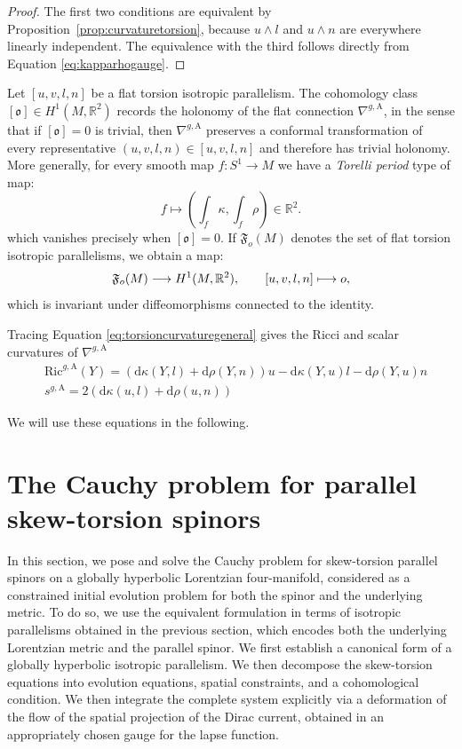 \documentclass[10pt,reqno,a4paper]{amsart}
\theoremstyle{plain}
\theoremstyle{definition}
\theoremstyle{remark}
\theoremstyle{remark}
\def\mA{\mathrm{A}}
\def\dd{\mathrm{d}}
\newcommand{\Ric}{\mathrm{Ric}}
\renewcommand{\(}{ (}
\renewcommand{\)}{ )}
\begin{document}
\begin{proof}
The first two conditions are equivalent by Proposition~\ref{prop:curvaturetorsion}, because $u\wedge l$ and $u\wedge n$ are everywhere linearly independent.  The equivalence with the third follows directly from Equation \eqref{eq:kapparhogauge}.
\end{proof}  

\noindent
Let $[u,v,l,n]$ be a flat torsion isotropic parallelism. The cohomology class $[\mathfrak{o}]  \in H^1 (M,\mathbb R^2)$ records the holonomy of the flat connection $\nabla^{g,\mA}$, in the sense that if $[\mathfrak{o}] = 0$ is trivial, then $\nabla^{g,\mA}$ preserves a conformal transformation of every representative $(u,v,l,n) \in [u,v,l,n]$ and therefore has trivial holonomy. More generally, for every smooth map $f \colon S^1 \to M$ we have a \emph{Torelli period} type of map:
\begin{equation*}
f\longmapsto (\int_f\kappa,\int_f\rho)\in\mathbb R^2.
\end{equation*}
which vanishes precisely when $[\mathfrak{o}] = 0$.  If $\mathfrak F_o(M)$ denotes the set of flat torsion isotropic parallelisms, we obtain a map:
\begin{equation*} 
\mathfrak F_o(M)\longrightarrow H^1(M,\mathbb R^2),
\qquad [u,v,l,n]\longmapsto\mathfrak \mathfrak{o},
\end{equation*}
which is invariant under diffeomorphisms connected to the identity.\medskip

\noindent
Tracing Equation \eqref{eq:torsioncurvaturegeneral} gives the Ricci and scalar curvatures of $\nabla^{g,\mA}$ 
\begin{eqnarray*}
& \Ric^{g,\mA} (Y) = (\dd\kappa(Y,l)+\dd\rho(Y,n) )u -\dd\kappa(Y,u)l-\dd\rho(Y,u)n \\
&s^{g,\mA} = 2 (\dd\kappa(u,l)+\dd\rho(u,n) ) 
\end{eqnarray*} 

\noindent
We will use these equations in the following. 
 
 

%
%
%
%

\section{The Cauchy problem for parallel skew-torsion spinors}
\label{sec:CauchyKillingSkew}

%
%
%
%

In this section, we pose and solve the Cauchy problem for skew-torsion parallel spinors on a globally hyperbolic Lorentzian four-manifold, considered as a constrained initial evolution problem for both the spinor and the underlying metric. To do so, we use the equivalent formulation in terms of isotropic parallelisms obtained in the previous section, which encodes both the underlying Lorentzian metric and the parallel spinor. We first establish a canonical form of a globally hyperbolic isotropic parallelism. We then decompose the skew-torsion equations into evolution equations, spatial constraints, and a cohomological condition. We then integrate the complete system explicitly via a deformation of the flow of the spatial projection of the Dirac current, obtained in an appropriately chosen gauge for the lapse function.  
 
\end{document}
